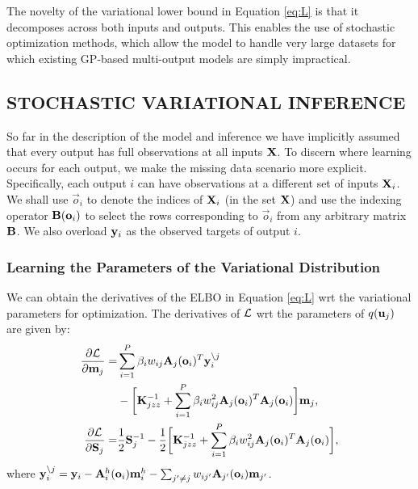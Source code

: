 The novelty of the  variational lower bound in Equation  \eqref{eq:L} is that it decomposes across both inputs and outputs.
This enables the use of stochastic optimization methods, which 
allow the model to handle  very large datasets for which existing GP-based multi-output models are simply 
impractical.  
%
\subsection{STOCHASTIC VARIATIONAL INFERENCE \label{sec:svi}}
\newcommand{\oi}{\vec{o}_i}

So far in the description of the model and inference  we have
 implicitly assumed that every output has full observations at all inputs $\mathbf{X}$.
To discern where learning occurs for each output, we make the missing data scenario more explicit.
Specifically, each output $i$ can have observations at a different set of inputs $\mathbf{X}_i$. 
We shall use $\oi$ to denote the indices of $\mathbf{X}_i$ (in the set $\mathbf{X}$) and use the indexing operator $\B(\oi)$ to select the rows corresponding to $\oi$ from any arbitrary matrix $\mathbf{B}$.
We also overload $\mathbf{y}_i$ as the observed targets of output $i$. 
%
\subsubsection{Learning the Parameters of the Variational Distribution}
\newcommand{\Lgj}{\calL^g_j}
\newcommand{\ynoj}{\y_i^{\backslash j}}
\newcommand{\Kjzz}{\mat{K}_{jzz}}
 We can obtain the derivatives of the ELBO in Equation  \eqref{eq:L}
  wrt the variational parameters for optimization.
The derivatives of $\mathcal{L}$ wrt the parameters of $q(\mathbf{u}_j)$ are given by:
\begin{align}
\deriv{\calL}{\m_j} 
=& \sum_{i=1}^P \beta_i w_{ij} \A_j(\oi)^T \ynoj \\
\nonumber
&- \bigg[\Kjzz^{-1} + \sum_{i=1}^P \beta_i w_{ij}^2 \A_j(\oi)^T \A_j(\oi) \bigg] \m_j \text{,} \\
\deriv{\calL}{\S_j} 
=& \frac{1}{2} \S_j^{-1} - \frac{1}{2} \bigg[ \Kjzz^{-1} + \sum_{i=1}^P \beta_i w_{ij}^2 \A_j(\oi)^T \A_j(\oi) \bigg],
\end{align}
where $\y_i^{\backslash j} = \y_i - \Ahi(\oi) \mhi - \sum_{j' \neq j} w_{ij'} \A_{j'}(\oi) \m_{j'}$.

